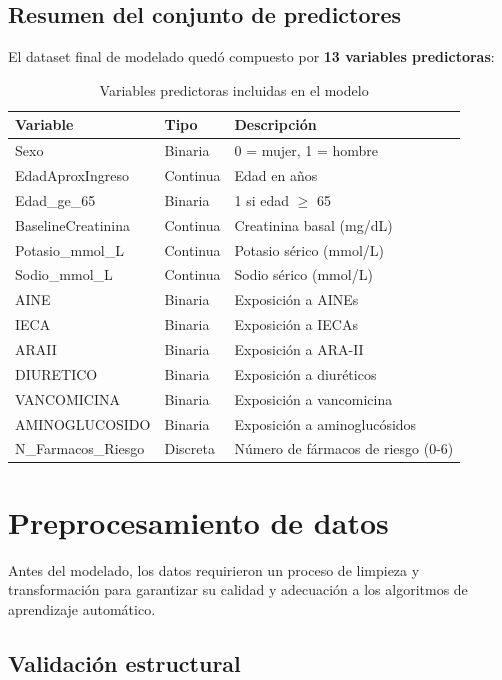 \documentclass[12pt, a4paper, oneside]{report}
\begin{document}
\subsection{Resumen del conjunto de predictores}

El dataset final de modelado quedó compuesto por \textbf{13 variables predictoras}:

\begin{table}[h]
\centering
\begin{tabular}{lll}
\hline
\textbf{Variable} & \textbf{Tipo} & \textbf{Descripción} \\
\hline
Sexo & Binaria & 0 = mujer, 1 = hombre \\
EdadAproxIngreso & Continua & Edad en años \\
Edad\_ge\_65 & Binaria & 1 si edad $\geq$ 65 \\
BaselineCreatinina & Continua & Creatinina basal (mg/dL) \\
Potasio\_mmol\_L & Continua & Potasio sérico (mmol/L) \\
Sodio\_mmol\_L & Continua & Sodio sérico (mmol/L) \\
AINE & Binaria & Exposición a AINEs \\
IECA & Binaria & Exposición a IECAs \\
ARAII & Binaria & Exposición a ARA-II \\
DIURETICO & Binaria & Exposición a diuréticos \\
VANCOMICINA & Binaria & Exposición a vancomicina \\
AMINOGLUCOSIDO & Binaria & Exposición a aminoglucósidos \\
N\_Farmacos\_Riesgo & Discreta & Número de fármacos de riesgo (0-6) \\
\hline
\end{tabular}
\caption{Variables predictoras incluidas en el modelo}
\label{tab:variables}
\end{table}

\section{Preprocesamiento de datos}

Antes del modelado, los datos requirieron un proceso de limpieza y transformación para garantizar su calidad y adecuación a los algoritmos de aprendizaje automático.

\subsection{Validación estructural}
\end{document}
